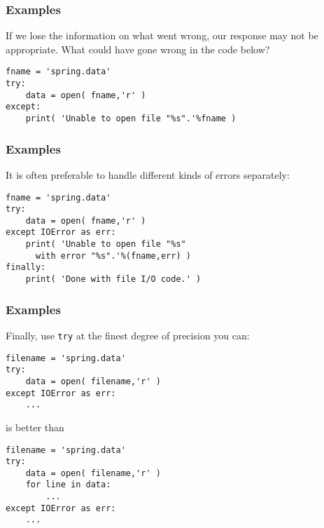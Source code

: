 \documentclass[11pt]{beamer}
\begin{document}
\begin{frame}[fragile]
  \frametitle{Examples}
  \Enlarge

  \begin{enumerate}
  \myitem  If we lose the information on what went wrong, our response may not be appropriate. \pause
  \myitem  What could have gone wrong in the code below?
  \end{enumerate}

  \begin{Verbatim}
fname = 'spring.data'
try:
    data = open( fname,'r' )
except:
    print( 'Unable to open file "%s".'%fname )
  \end{Verbatim}
\end{frame}

\begin{frame}[fragile]
  \frametitle{Examples}
  \Enlarge

  \begin{enumerate}
  \myitem  It is often preferable to handle different kinds of errors separately:
  \end{enumerate}

  \begin{Verbatim}
fname = 'spring.data'
try:
    data = open( fname,'r' )
except IOError as err:
    print( 'Unable to open file "%s" 
      with error "%s".'%(fname,err) )
finally:
    print( 'Done with file I/O code.' )
  \end{Verbatim}
\end{frame}

\begin{frame}[fragile]
  \frametitle{Examples}
  \Enlarge

  \begin{enumerate}
  \myitem  Finally, use \texttt{try} at the finest degree of precision you can:
  \end{enumerate}

  \begin{Verbatim}
filename = 'spring.data'
try:
    data = open( filename,'r' )
except IOError as err:
    ...
  \end{Verbatim}

  is better than

  \begin{Verbatim}
filename = 'spring.data'
try:
    data = open( filename,'r' )
    for line in data:
        ...
except IOError as err:
    ...
  \end{Verbatim}
\end{frame}
\end{document}
